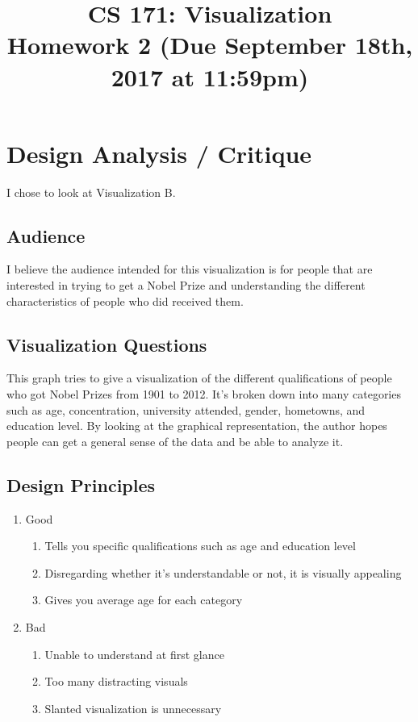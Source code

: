\documentclass[11pt]{article}
\begin{document}
\title{
  CS 171: Visualization \\
  \Large{Homework 2 (Due September 18th, 2017 at 11:59pm)}
}
\date{}

\maketitle

\vspace{-1cm}


\section*{Design Analysis / Critique}
I chose to look at Visualization B.

\subsection{Audience}
I believe the audience intended for this visualization is for people that are interested in trying to get a Nobel Prize and understanding the different characteristics of people who did received them.

\subsection{Visualization Questions}
This graph tries to give a visualization of the different qualifications of people who got Nobel Prizes from 1901 to 2012. It's broken down into many categories such as age, concentration, university attended, gender, hometowns, and education level. By looking at the graphical representation, the author hopes people can get a general sense of the data and be able to analyze it.

\subsection{Design Principles}

\begin{enumerate}
  \item Good
  \begin{enumerate}
    \item Tells you specific qualifications such as age and education level
    \item Disregarding whether it's understandable or not, it is visually appealing
    \item Gives you average age for each category
  \end{enumerate}
  \item Bad
  \begin{enumerate}
    \item Unable to understand at first glance
    \item Too many distracting visuals
    \item Slanted visualization is unnecessary
  \end{enumerate}
\end{enumerate}
\end{document}
